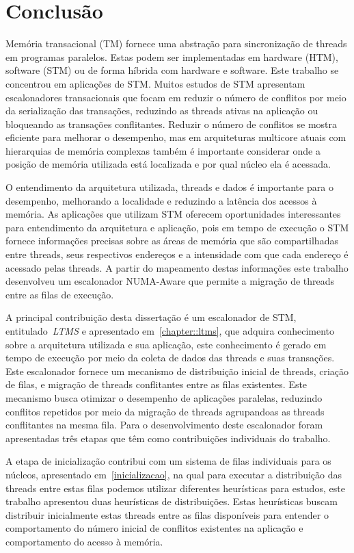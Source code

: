 \documentclass[diss,capa]{texufpel}
\begin{document}
\chapter{Conclusão}
\label{chapter::conclusao}

Memória transacional (TM) fornece uma abstração para sincronização de threads em programas paralelos. Estas podem ser implementadas em hardware (HTM), software (STM) ou de forma híbrida com hardware e software. Este trabalho se concentrou em aplicações de STM. Muitos estudos de STM apresentam escalonadores transacionais que focam em reduzir o número de conflitos por meio da serialização das transações, reduzindo as threads ativas na aplicação ou bloqueando as transações conflitantes. Reduzir o número de conflitos se mostra eficiente para melhorar o desempenho, mas em arquiteturas multicore atuais com hierarquias de memória complexas também é importante considerar onde a posição de memória utilizada está localizada e por qual núcleo ela é acessada.

O entendimento da arquitetura utilizada, threads e dados é importante para o desempenho, melhorando a localidade e reduzindo a latência dos acessos à memória. As aplicações que utilizam STM oferecem oportunidades interessantes para entendimento da arquitetura e aplicação, pois em tempo de execução o STM fornece informações precisas sobre as áreas de memória que são compartilhadas entre threads, seus respectivos endereços e a intensidade com que cada endereço é acessado pelas threads. A partir do mapeamento destas informações este trabalho desenvolveu um escalonador NUMA-Aware que permite a migração de threads entre as filas de execução.

A principal contribuição desta dissertação é um escalonador de STM, entitulado~\emph{LTMS} e apresentado em~\ref{chapter::ltms}, que adquira conhecimento sobre a arquitetura utilizada e sua aplicação, este conhecimento é gerado em tempo de execução por meio da coleta de dados das threads e suas transações. Este escalonador fornece um mecanismo de distribuição inicial de threads, criação de filas, e migração de threads conflitantes entre as filas existentes. Este mecanismo busca otimizar o desempenho de aplicações paralelas, reduzindo conflitos repetidos por meio da migração de threads agrupandoas as threads conflitantes na mesma fila. Para o desenvolvimento deste escalonador foram apresentadas três etapas que têm como contribuições individuais do trabalho.

A etapa de inicialização contribui com um sistema de filas individuais para os núcleos, apresentado em~\ref{inicializacao}, na qual para executar a distribuição das threads entre estas filas podemos utilizar diferentes heurísticas para estudos, este trabalho apresentou duas heurísticas de distribuições. Estas heurísticas buscam distribuir inicialmente estas threads entre as filas disponíveis para entender o comportamento do número inicial de conflitos existentes na aplicação e comportamento do acesso à memória.
\end{document}
